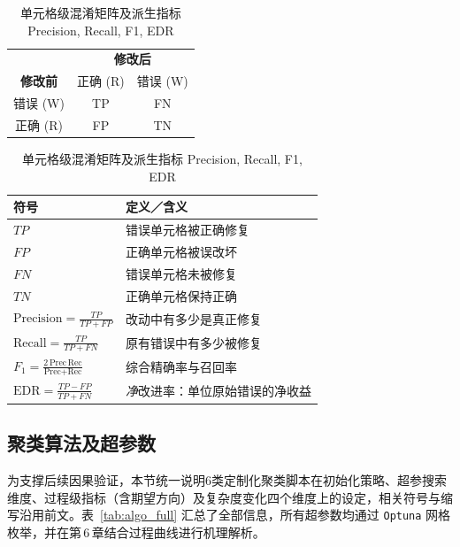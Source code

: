 \documentclass[10pt]{article} %
\numberwithin{equation}{section}
\begin{document}
\begin{table}[ht]
\centering\small
\setlength{\tabcolsep}{6pt}
\renewcommand{\arraystretch}{1.25}
\caption{单元格级混淆矩阵及派生指标 Precision, Recall, F1, EDR}
\begin{tabular}{c|cc}
\toprule
 & \multicolumn{2}{c}{\textbf{修改后}}\\\cline{2-3}
\textbf{修改前} & 正确 (R) & 错误 (W)\\\hline
错误 (W) & TP & FN\\
正确 (R) & FP & TN\\
\bottomrule
\end{tabular}

\vspace{0.6em}
\begin{tabular}{@{}lp{9.5cm}@{}}
\toprule
\textbf{符号} & \textbf{定义／含义} \\
\midrule
$TP$ & 错误单元格被正确修复\\
$FP$ & 正确单元格被误改坏\\
$FN$ & 错误单元格未被修复\\
$TN$ & 正确单元格保持正确\\
\midrule
$\displaystyle\text{Precision}=\frac{TP}{TP+FP}$ &
改动中有多少是真正修复 \\[4pt]
$\displaystyle\text{Recall}=\frac{TP}{TP+FN}$ &
原有错误中有多少被修复 \\[4pt]
$\displaystyle\text{\(F_1\)}=\frac{2\,\text{Prec}\,\text{Rec}}{\text{Prec}+\text{Rec}}$ &
综合精确率与召回率 \\[6pt]
$\displaystyle\text{EDR}=\frac{TP-FP}{TP+FN}$ &
\emph{净}改进率：单位原始错误的净收益 \\
\bottomrule
\end{tabular}
\label{tab:cell-metrics-def}
\end{table}

\subsection{聚类算法及超参数}\label{sec:clu_algo}

\textcolor[rgb]{0.00,0.07,1.00}{为支撑后续因果验证，本节统一说明6类定制化聚类脚本在初始化策略、超参搜索维度、过程级指标（含期望方向）及复杂度变化四个维度上的设定，相关符号与缩写沿用前文。表~\ref{tab:algo_full} 汇总了全部信息，所有超参数均通过 \texttt{Optuna} 网格枚举，并在第\,6\,章结合过程曲线进行机理解析。}
\end{document}
